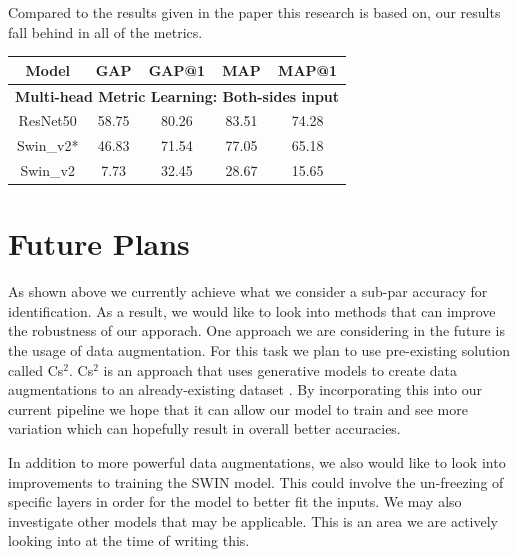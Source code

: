 \documentclass[10pt,twocolumn,letterpaper]{article}
\begin{document}
Compared to the results given in the paper this research is based on, our results fall behind in all of the metrics.   \par

\begin{table}[h]
    \begin{tabular}{@{}|ccccc|@{}}
    \toprule
    \multicolumn{1}{|c|}{Model}     & \multicolumn{1}{c|}{GAP}   & \multicolumn{1}{c|}{GAP@1} & \multicolumn{1}{c|}{MAP}   & MAP@1 \\ \midrule
    \multicolumn{5}{|c|}{\textbf{Multi-head Metric Learning: Both-sides input}}                                                    \\ \midrule
    \multicolumn{1}{|c|}{ResNet50}  & \multicolumn{1}{c|}{58.75} & \multicolumn{1}{c|}{80.26} & \multicolumn{1}{c|}{83.51} & 74.28 \\ \midrule
    \multicolumn{1}{|c|}{Swin\_v2*} & \multicolumn{1}{c|}{46.83} & \multicolumn{1}{c|}{71.54} & \multicolumn{1}{c|}{77.05} & 65.18 \\ \midrule
    \multicolumn{1}{|c|}{Swin\_v2}  & \multicolumn{1}{c|}{7.73}  & \multicolumn{1}{c|}{32.45} & \multicolumn{1}{c|}{28.67} & 15.65 \\ \bottomrule
    \end{tabular}
    \end{table}

\section{Future Plans}

As shown above we currently achieve what we consider a sub-par accuracy for identification. As a result, we would like to look into methods that can improve the robustness of our apporach. One approach we are considering in the future is the usage of data augmentation. For this task we plan to use pre-existing solution called Cs$^2$. Cs$^2$ is an approach that uses generative models to create data augmentations to an already-existing dataset \cite{cs2}. By incorporating this into our current pipeline we hope that it can allow our model to train and see more variation which can hopefully result in overall better accuracies.  \par

In addition to more powerful data augmentations, we also would like to look into improvements to training the SWIN model. This could involve the un-freezing of specific layers in order for the model to better fit the inputs. We may also investigate other models that may be applicable. This is an area we are actively looking into at the time of writing this. \par 
\end{document}
